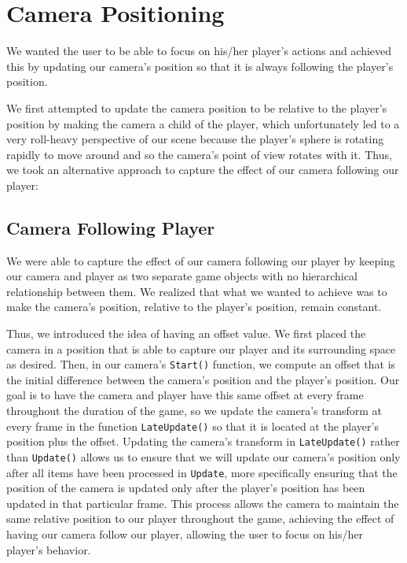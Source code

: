 \documentclass[12pt]{article}
\begin{document}
\section{Camera Positioning}
  We wanted the user to be able to focus on his/her player's actions and achieved this by updating our camera's position so that it is always following the player's position. 

  We first attempted to update the camera position to be relative to the player's position by making the camera a child of the player, which unfortunately led to a very roll-heavy perspective of our scene because the player's sphere is rotating rapidly to move around and so the camera's point of view rotates with it. Thus, we took an alternative approach to capture the effect of our camera following our player: 

\subsection{Camera Following Player}
  We were able to capture the effect of our camera following our player by keeping our camera and player as two separate game objects with no hierarchical relationship between them.
  We realized that what we wanted to achieve was to make the camera's position, relative to the player's position, remain constant. 

  Thus, we introduced the idea of having an offset value.
  We first placed the camera in a position that is able to capture our player and its surrounding space as desired. 
  Then, in our camera's \verb+Start()+ function, we compute an offset that is the initial difference between the camera's position and the player's position. 
  Our goal is to have the camera and player have this same offset at every frame throughout the duration of the game, so we update the camera's transform at every frame in the function \verb+LateUpdate()+ so that it is located at the player's position plus the offset. 
  Updating the camera's transform in \verb+LateUpdate()+ rather than \verb+Update()+ allows us to ensure that we will update our camera's position only after all items have been processed in \verb+Update+, more specifically ensuring that the position of the camera is updated only after the player's position has been updated in that particular frame.
  This process allows the camera to maintain the same relative position to our player throughout the game, achieving the effect of having our camera follow our player, allowing the user to focus on his/her player's behavior.
  
\end{document}

